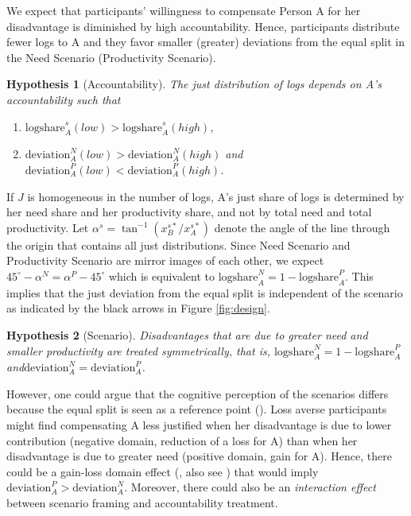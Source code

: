 \documentclass[smallcondensed]{svjour3}
\newtheorem{Hypothesis}{Hypothesis}
\begin{document}
%
\par
%
We expect that participants' willingness to compensate Person A for her disadvantage is diminished by high accountability. Hence, participants distribute fewer logs to A and they favor smaller (greater) deviations from the equal split in the Need Scenario (Productivity Scenario).
%
\begin{Hypothesis}[Accountability] The just distribution of logs depends on A's accountability such that
\begin{enumerate}
\renewcommand{\labelenumi}{\alph{enumi})}
\item $\mbox{logshare}_A^s(low)>\mbox{logshare}_A^s(high)$,
\item $\mbox{deviation}_A^N(low)>\mbox{deviation}_A^N(high)$ and $\mbox{deviation}_A^P(low)<\mbox{deviation}_A^P(high)$.
\end{enumerate}
\end{Hypothesis}
%
\par
%
If $J$ is homogeneous in the number of logs, A's just share of logs is determined by her need share and her productivity share, and not by total need and total productivity. Let $\alpha^s=\tan^{-1}(x_B^{s\ast}/x_A^{s\ast})$ denote the angle of the line through the origin that contains all just distributions. Since Need Scenario and Productivity Scenario are mirror images of each other, we expect $45^\circ-\alpha^N=\alpha^P-45^\circ$ which is equivalent to $\mbox{logshare}_A^N=1-\mbox{logshare}_A^P$. This implies that the just deviation from the equal split is independent of the scenario as indicated by the black arrows in Figure \ref{fig:design}.
%
\begin{Hypothesis}[Scenario] Disadvantages that are due to greater need and smaller productivity are treated symmetrically, that is,
$\mbox{logshare}_A^N=1-\mbox{logshare}_A^P$ and\linebreak $\mbox{deviation}_A^N=\mbox{deviation}_A^P$.
\end{Hypothesis}
%
\par
%
However, one could argue that the cognitive perception of the scenarios differs because the equal split is seen as a reference point (\citealt{trueblood_reference_2015}). Loss averse participants might find compensating A less justified when her disadvantage is due to lower contribution (negative domain, reduction of a loss for A) than when her disadvantage is due to greater need (positive domain, gain for A). Hence, there could be a gain-loss domain effect (\citealt{tversky_loss_1991}, also see \citealt{weis_needs_2017}) that would imply $\mbox{deviation}_A^P>\mbox{deviation}_A^N$. Moreover, there could also be an \textit{interaction effect} between scenario framing and accountability treatment.\par
\end{document}
